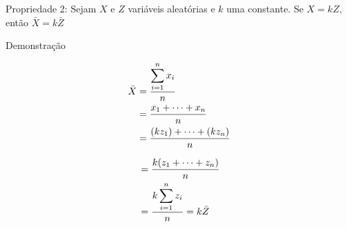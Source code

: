 \documentclass[14pt,aspectratio=1610]{beamer}
\begin{document}
\begin{frame}{}
	\frametitle{}
	\begin{block}{Propriedade 2:}
		\justifying
		Sejam $X$ e $Z$ variáveis aleatórias e $k$ uma constante. Se $X=kZ,$ então $\bar{X}=k\bar{Z}$
	\end{block}
	\pause
	\begin{block}{Demonstração}
		\begin{minipage}{0.4\textwidth}
			\begin{align*}
				\bar{X}&=\dfrac{{\displaystyle \sum_{i=1}^{n}x_{i}}}{n}\\ 
				\vspace{0.1cm}
				&=\dfrac{x_{1}+\cdots+x_{n}}{n}\\ \vspace{0.1cm}
				&=\dfrac{(kz_{1})+\cdots+(kz_{n})}{n}\\
			\end{align*}
		\end{minipage}\pause\hfill
		\begin{minipage}{0.4\textwidth}
			\begin{align*}
				&=\dfrac{k(z_{1}+\cdots+z_{n})}{n}\\ \vspace{0.1cm}
				&=\dfrac{{\displaystyle k\sum_{i=1}^{n}z_{i}}}{n}=k\bar{Z}
			\end{align*}
		\end{minipage}
	\end{block}
\end{frame}
\end{document}
